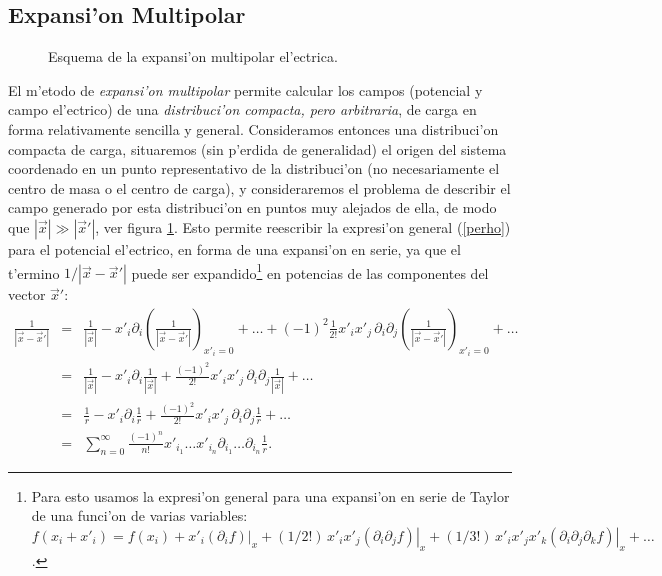 \subsection{Expansi'on Multipolar}
\begin{figure}[!h]
\centerline{ }
\caption{Esquema de la expansi'on multipolar el'ectrica.}
\label{fig:emc}
\end{figure}
El m'etodo de {\em expansi'on multipolar} permite calcular los campos (potencial y campo el'ectrico) de una
\textit{distribuci'on compacta, pero arbitraria}, de carga en forma relativamente sencilla y general. Consideramos entonces una distribuci'on compacta de carga, situaremos (sin p'erdida de generalidad) el origen del sistema coordenado en un punto representativo de la distribuci'on (no necesariamente el centro de masa o el centro de carga), y consideraremos el problema de describir el
campo generado por esta distribuci'on en puntos muy alejados de ella, de modo
que $|\vec{x}|\gg|\vec{x}'|$, ver figura \ref{fig:emc}. Esto permite
reescribir la expresi'on general (\ref{perho}) para el potencial
el'ectrico, en forma de una expansi'on en serie, ya
que el t'ermino $1/\left|\vec{x}-\vec{x}'\right|$ puede ser expandido\footnote{Para esto usamos la expresi'on general para una expansi'on en serie de Taylor de una funci'on de varias variables: $f(x_i+x'_i)=f(x_i)+x'_i\left.(\partial_if)\right|_x+(1/2!)\,x'_ix'_j\left.(\partial_i\partial_jf)\right|_x +(1/3!)\,x'_ix'_jx'_k\left.(\partial_i\partial_j\partial_kf)\right|_x+\dots$.}
en potencias de las componentes del vector $\vec{x}'$:
\begin{eqnarray}
\frac{1}{\left|\vec{x}-\vec{x}'\right|}
&=&\frac{1}{\left|\vec{x}\right|}
-x'_i\partial_i\left(\frac{1}{\left|\vec{x}-\vec{x}'\right|} \right)
_{x'_i=0}+\dots+(-1)^2\frac{1}{2!}x'_ix'_j\,
\partial_i\partial_j\left(\frac{1} { \left|\vec{x}-\vec{x}
'\right|} \right) _{x'_i=0}+\dots \\
&=&\frac{1}{\left|\vec{x}\right|}-x'_i\partial_i\frac{1}{\left|\vec{x}\right|}
 +\frac{(-1)^2}{2!}x'_ix'_j\,\partial_i\partial_j\frac{1}{\left|\vec{x}\right|}
+\dots \\
&=&\frac{1}{r}-x'_i\partial_i\frac{1}{r}+\frac{(-1)^2}{2!}x'_ix'_j\,
\partial_i\partial_j\frac{1}{r} +\dots \\
&=&\sum_{n=0}^\infty\frac{(-1)^n}{n!}x'_{i_1}\dots x'_{i_n}\partial_{i_1}\dots
\partial_{i_n}\frac{1}{r} .\label{exp1or}
\end{eqnarray}
